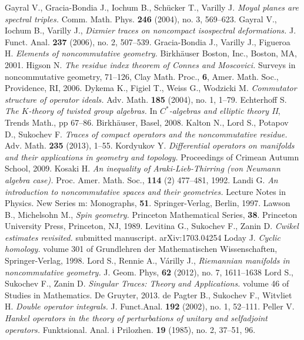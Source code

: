 \begin{thebibliography}{99}
 Gayral V., Gracia-Bondia J., Iochum B., Sch\"ucker T., Varilly J. {\it Moyal planes are spectral triples.} Comm. Math. Phys. {\bf 246} (2004), no. 3, 569--623.
 Gayral V., Iochum B., Varilly J., {\it Dixmier traces on noncompact isospectral deformations.} J. Funct. Anal. {\bf 237} (2006), no. 2, 507--539.
 Gracia-Bondia J., Varilly J., Figueroa H. {\it Elements of noncommutative geometry.} Birkhäuser Boston, Inc., Boston, MA, 2001.
  Higson N. {\it The residue index theorem of Connes and Moscovici.} Surveys in noncommutative geometry, 71--126, Clay Math. Proc., {\bf 6}, Amer. Math. Soc., Providence, RI, 2006.
 Dykema K., Figiel T., Weiss G., Wodzicki M. {\it Commutator structure of operator ideals.}  Adv. Math. {\bf 185} (2004), no. 1, 1--79.
 Echterhoff S. {\it The $K$-theory of twisted group algebras.} In {\it $C^\ast$-algebras and elliptic theory II}, Trends Math., pp 67--86. Birkh\"auser, Basel, 2008.
 Kalton N., Lord S., Potapov D., Sukochev F. {\it Traces of compact operators and the noncommutative residue.} Adv. Math. {\bf 235} (2013), 1--55.
 Kordyukov Y. {\it Differential operators on manifolds and their applications in geometry and topology.} Proceedings of Crimean Autumn School, 2009. 
 Kosaki H. {\it An inequality of Araki-Lieb-Thirring (von Neumann algebra case).} Proc. Amer. Math. Soc., {\bf 114} (2) 477--481, 1992.
 Landi G. {\it An introduction to noncommutative spaces and their geometries.} Lecture Notes in Physics. New Series m: Monographs, {\bf 51}. Springer-Verlag, Berlin, 1997.
 Lawson B., Michelsohn M., {\it Spin geometry.} Princeton Mathematical Series, {\bf 38}. Princeton University Press, Princeton, NJ, 1989.
 Levitina G., Sukochev F., Zanin D. {\it Cwikel estimates revisited.} submitted manuscript. arXiv:1703.04254
 Loday J. {\it Cyclic homology.} volume 301 of Grundlehren der Mathematischen Wissenschaften, Springer-Verlag, 1998.
 Lord S., Rennie A., V\'arilly J., {\it Riemannian manifolds in noncommutative geometry.} J. Geom. Phys, {\bf 62} (2012), no. 7, 1611--1638
 Lord S., Sukochev F., Zanin D. {\it Singular Traces: Theory and Applications.} volume 46 of Studies in Mathematics. De Gruyter, 2013.
 de Pagter B., Sukochev F., Witvliet H. {\it Double operator integrals.} J. Funct.Anal. {\bf 192} (2002), no. 1, 52--111.
 Peller V. {\it Hankel operators in the theory of perturbations of unitary and selfadjoint operators.} Funktsional. Anal. i Prilozhen. {\bf 19} (1985), no. 2, 37--51, 96.

\end{thebibliography}
